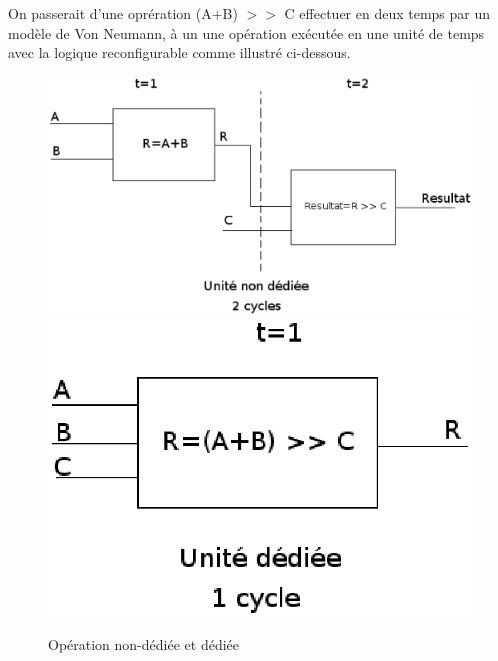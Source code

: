 On passerait d'une oprération (A+B) $>>$ C effectuer en deux temps par un modèle de
Von Neumann, à un une opération exécutée en une unité de temps avec la logique
reconfigurable comme illustré ci-dessous.

\begin{figure}
\begin{center}
  \includegraphics[scale=0.4]{bloc2.eps}
  \includegraphics[scale=0.4]{bloc1.eps}
\end{center}
\caption{Opération non-dédiée et dédiée}
\end{figure}


